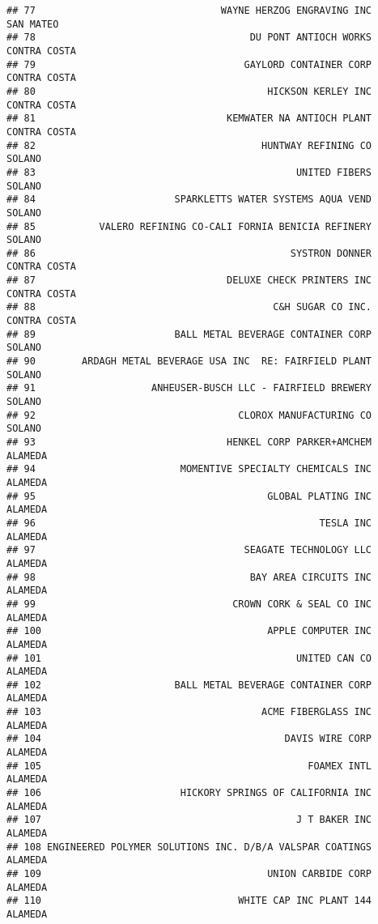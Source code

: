 \documentclass[
]{book}
\begin{document}
\begin{verbatim}
## 77                                WAYNE HERZOG ENGRAVING INC     SAN MATEO
## 78                                     DU PONT ANTIOCH WORKS  CONTRA COSTA
## 79                                    GAYLORD CONTAINER CORP  CONTRA COSTA
## 80                                        HICKSON KERLEY INC  CONTRA COSTA
## 81                                 KEMWATER NA ANTIOCH PLANT  CONTRA COSTA
## 82                                       HUNTWAY REFINING CO        SOLANO
## 83                                             UNITED FIBERS        SOLANO
## 84                        SPARKLETTS WATER SYSTEMS AQUA VEND        SOLANO
## 85           VALERO REFINING CO-CALI FORNIA BENICIA REFINERY        SOLANO
## 86                                            SYSTRON DONNER  CONTRA COSTA
## 87                                 DELUXE CHECK PRINTERS INC  CONTRA COSTA
## 88                                         C&H SUGAR CO INC.  CONTRA COSTA
## 89                        BALL METAL BEVERAGE CONTAINER CORP        SOLANO
## 90        ARDAGH METAL BEVERAGE USA INC  RE: FAIRFIELD PLANT        SOLANO
## 91                    ANHEUSER-BUSCH LLC - FAIRFIELD BREWERY        SOLANO
## 92                                   CLOROX MANUFACTURING CO        SOLANO
## 93                                 HENKEL CORP PARKER+AMCHEM       ALAMEDA
## 94                         MOMENTIVE SPECIALTY CHEMICALS INC       ALAMEDA
## 95                                        GLOBAL PLATING INC       ALAMEDA
## 96                                                 TESLA INC       ALAMEDA
## 97                                    SEAGATE TECHNOLOGY LLC       ALAMEDA
## 98                                     BAY AREA CIRCUITS INC       ALAMEDA
## 99                                  CROWN CORK & SEAL CO INC       ALAMEDA
## 100                                       APPLE COMPUTER INC       ALAMEDA
## 101                                            UNITED CAN CO       ALAMEDA
## 102                       BALL METAL BEVERAGE CONTAINER CORP       ALAMEDA
## 103                                      ACME FIBERGLASS INC       ALAMEDA
## 104                                          DAVIS WIRE CORP       ALAMEDA
## 105                                              FOAMEX INTL       ALAMEDA
## 106                        HICKORY SPRINGS OF CALIFORNIA INC       ALAMEDA
## 107                                            J T BAKER INC       ALAMEDA
## 108 ENGINEERED POLYMER SOLUTIONS INC. D/B/A VALSPAR COATINGS       ALAMEDA
## 109                                       UNION CARBIDE CORP       ALAMEDA
## 110                                  WHITE CAP INC PLANT 144       ALAMEDA

\end{verbatim}
\end{document}
